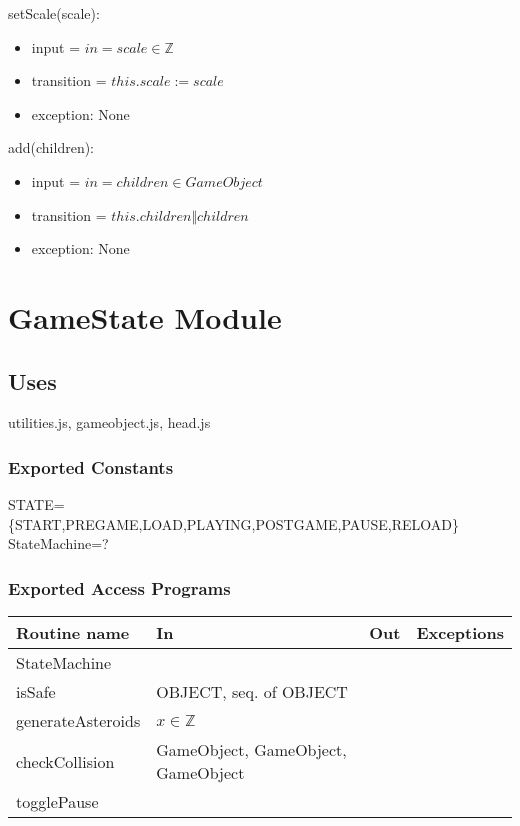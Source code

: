 \documentclass[12pt]{article}
\begin{document}
\noindent setScale(scale):
\begin{itemize}
    \item input = $in = scale \in \mathbb{Z}$
    \item transition = $this.scale := scale$
    \item exception: None
\end{itemize}

\noindent add(children):
\begin{itemize}
    \item input = $in = children \in GameObject$
    \item transition = $this.children \Vert children$
    \item exception: None
\end{itemize}



\newpage

\section*{GameState Module}

\subsection*{Uses}

utilities.js, gameobject.js, head.js\\

\subsubsection*{Exported Constants}

STATE=\{START,PREGAME,LOAD,PLAYING,POSTGAME,PAUSE,RELOAD\}\\
StateMachine=?\\

\subsubsection*{Exported Access Programs}

\begin{tabular}{| l | l | l | l |}
    \hline
    \textbf{Routine name} & \textbf{In} & \textbf{Out} & \textbf{Exceptions}\\
    \hline
    StateMachine &  & ~ & ~\\
    \hline
    isSafe & OBJECT, seq. of OBJECT & ~ & ~\\
    \hline
    generateAsteroids & $x \in \mathbb{Z}$ & ~ & ~ \\
    \hline
    checkCollision & GameObject, GameObject, GameObject & ~ & ~ \\
    \hline
    togglePause & ~ & ~ & ~ \\
    \hline
\end{tabular}
\end{document}
